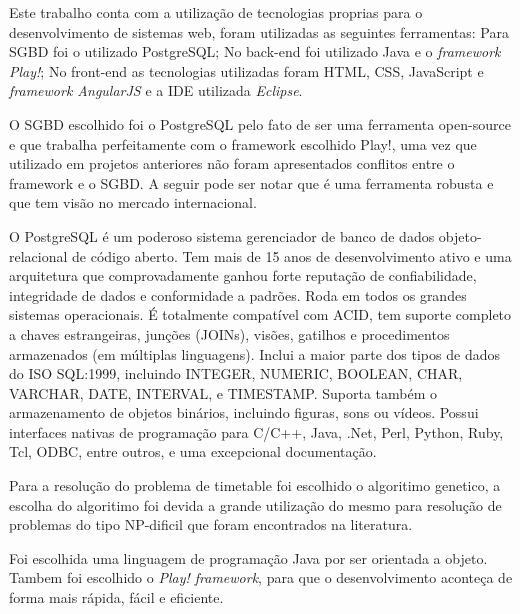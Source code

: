 \documentclass{abntpuc}
\begin{document}
Este trabalho conta com a utilização de tecnologias proprias para o desenvolvimento de sistemas web, foram utilizadas as seguintes ferramentas: Para SGBD foi o utilizado PostgreSQL; No back-end foi utilizado Java e o \textit{framework Play!}; No front-end as tecnologias utilizadas foram HTML, CSS, JavaScript e \textit{framework AngularJS} e a IDE utilizada \textit{Eclipse}.\par




O SGBD escolhido foi o PostgreSQL pelo fato de ser uma ferramenta open-source e que trabalha perfeitamente com o framework escolhido Play!, uma vez que utilizado em projetos anteriores não foram apresentados conflitos entre o framework e o SGBD. A seguir pode ser notar que é uma ferramenta robusta e que tem visão no mercado internacional.\par

O PostgreSQL é um poderoso sistema gerenciador de banco de dados objeto-relacional de código aberto.  Tem mais de 15 anos de desenvolvimento ativo e uma arquitetura que comprovadamente ganhou forte reputação de confiabilidade, integridade de dados e conformidade a padrões.  Roda em todos os grandes sistemas operacionais. É totalmente compatível com ACID, tem suporte completo a chaves estrangeiras, junções (JOINs), visões, gatilhos e procedimentos armazenados (em múltiplas linguagens).  Inclui a maior parte dos tipos de dados do ISO SQL:1999, incluindo INTEGER, NUMERIC, BOOLEAN, CHAR, VARCHAR, DATE, INTERVAL, e TIMESTAMP.  Suporta também o armazenamento de objetos binários, incluindo figuras, sons ou vídeos.  Possui interfaces nativas de programação para C/C++, Java, .Net, Perl, Python, Ruby, Tcl, ODBC, entre outros, e uma excepcional documentação.\cite{postgresql}



Para a resolução do problema de timetable foi escolhido o algoritimo genetico, a escolha do algoritimo foi devida a grande utilização do mesmo para resolução de problemas do tipo NP-dificil que foram encontrados na literatura.
\par





Foi escolhida uma linguagem de programação Java por ser orientada a objeto. Tambem foi escolhido o \textit{Play! framework}, para que o desenvolvimento aconteça de forma mais rápida, fácil e eficiente.\par
\end{document}
